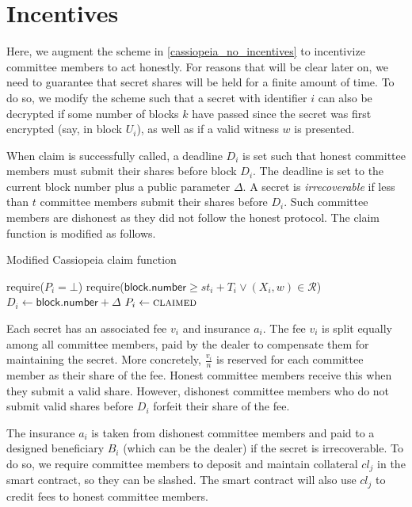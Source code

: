 \section{Incentives}
Here, we augment the scheme in \ref{cassiopeia_no_incentives} to incentivize committee members to act honestly.
For reasons that will be clear later on, we need to guarantee that secret shares will be held for a finite amount of time.
To do so, we modify the scheme such that a secret with identifier $i$ can also be decrypted if some number of blocks $k$ have passed since the secret was first encrypted (say, in block $U_i$), as well as if a valid witness $w$ is presented.

When \textsf{claim} is successfully called, a deadline $D_i$ is set such that honest committee members must submit their shares before block $D_i$.
The deadline is set to the current block number plus a public parameter $\Delta$.
A secret is \emph{irrecoverable} if less than $t$ committee members submit their shares before $D_i$.
Such committee members are dishonest as they did not follow the honest protocol.
The \textsf{claim} function is modified as follows.

\begin{algorithm}[H]
\caption{Modified Cassiopeia \textsf{claim} function}
    \begin{algorithmic}[1]
                \State require($P_i = \bot$)
                \State require($\textsf{block.number} \geq st_i + T_i \lor (X_i, w) \in \mathcal{R}$)
                \State $D_i \gets \textsf{block.number} + \Delta$
                \State $P_i \gets \textsc{claimed}$
            \EndFunction
    \end{algorithmic}
\end{algorithm}

Each secret has an associated fee $v_i$ and insurance $a_i$.
The fee $v_i$ is split equally among all committee members, paid by the dealer to compensate them for maintaining the secret.
More concretely, $\frac{v_i}{n}$ is reserved for each committee member as their share of the fee.
Honest committee members receive this when they submit a valid share.
However, dishonest committee members who do not submit valid shares before $D_i$ forfeit their share of the fee.

The insurance $a_i$ is taken from dishonest committee members and paid to a designed beneficiary $B_i$ (which can be the dealer) if the secret is irrecoverable.
To do so, we require committee members to deposit and maintain collateral $cl_j$ in the smart contract, so they can be slashed.
The smart contract will also use $cl_j$ to credit fees to honest committee members.

